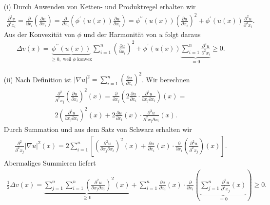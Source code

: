 \begin{solution}
\phantom{}
  \begin{itemize}

  \item[(i)] Durch Anwenden von Ketten- und Produktregel erhalten wir
  \begin{align*}
      \frac{\partial^2 v}{\partial^2 x_i} = \frac{\partial}{\partial x_i} \left(\frac{\partial v}{\partial x_i}\right) = \frac{\partial}{\partial x_i} \left(\phi^\prime(u(x)) \frac{\partial u}{\partial x_i}\right) = \phi^{\prime\prime}(u(x)) \left(\frac{\partial u}{\partial x_i}\right)^2 + \phi^\prime(u(x)) \frac{\partial^2 u}{\partial^2 x_i}.
  \end{align*}
  Aus der Konvexität von $\phi$ und der Harmonität von $u$ folgt daraus
  \begin{align*}
      \Delta v(x) = \underbrace{\phi^{\prime\prime}(u(x))}_{\geq 0, \text{~weil $\phi$ konvex}} \sum_{i=1}^n \left(\frac{\partial u}{\partial x_i}\right)^2 + \phi^\prime(u(x)) \underbrace{\sum_{i=1}^n \frac{\partial^2 u}{\partial^2 x_i}}_{= 0} \geq 0.
  \end{align*}
  \item[(ii)] Nach Definition ist $|\nabla u|^2 = \sum_{i=1}^n \left(\frac{\partial u}{\partial x_i}\right)^2$. Wir berechnen
\begin{align*}
    \frac{\partial^2}{\partial^2 x_j} \left(\frac{\partial u}{\partial x_i}\right)^2 (x) = \frac{\partial}{\partial x_j} \left(2 \frac{\partial u}{\partial x_i} \cdot \frac{\partial^2 u}{\partial x_j \partial x_i} \right)(x) = \\
    2 \left(\frac{\partial^2 u}{\partial x_j \partial x_i}\right)^2 (x) + 2\frac{\partial u}{\partial x_i}(x) \cdot \frac{\partial^3 u}{\partial^2 x_j \partial x_i} (x).
\end{align*}
Durch Summation und aus dem Satz von Schwarz erhalten wir
\begin{align*}
    \frac{\partial^2}{\partial^2 x_j} |\nabla u|^2 (x) = 2 \sum_{i=1}^n \left[ \left(\frac{\partial^2 u}{\partial x_j \partial x_i} \right)^2(x) + \frac{\partial u}{\partial x_i}(x) \cdot \frac{\partial}{\partial x_i} \left(\frac{\partial^2 u}{\partial^2 x_j}\right)(x) \right].
\end{align*}
Abermaliges Summieren liefert
\begin{align*}
    \frac{1}{2} \Delta v (x) = \underbrace{\sum_{j=1}^n \sum_{i=1}^n \left(\frac{\partial^2 u}{\partial x_j \partial x_i} \right)^2(x)}_{\geq 0} +
    \sum_{i=1}^n \frac{\partial u}{\partial x_i}(x) \cdot \frac{\partial}{\partial x_i} \left( \underbrace{\sum_{j=1}^n \frac{\partial^2 u}{\partial^2 x_j}(x)}_{= 0} \right) \geq 0.
\end{align*}
  \end{itemize}

\end{solution}

